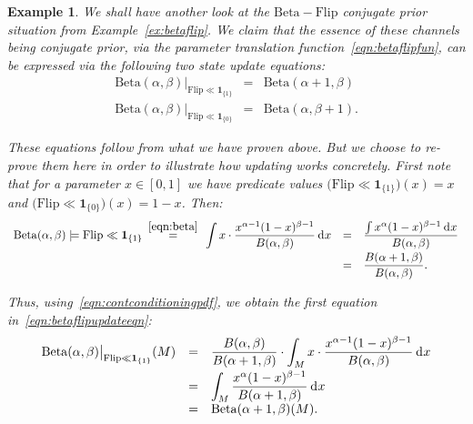 \documentclass{mscs}
\newcommand{\intd}{{\kern.2em}\mathrm{d}{\kern.03em}}
\newcommand{\indic}[1]{\mathbf{1}_{#1}}
\newcommand{\betachan}{\ensuremath{\mathrm{Beta}}}
\newcommand{\flipchan}{\ensuremath{\mathrm{Flip}}}
\newtheorem{example}[theorem]{Example}
\begin{document}
\begin{example}
\label{ex:betaflipupdate}
We shall have another look at the $\betachan - \flipchan$ conjugate
prior situation from Example~\ref{ex:betaflip}. We claim that the
essence of these channels being conjugate prior, via the parameter
translation function~\eqref{eqn:betaflipfun}, can be expressed via the
following two state update equations:
\begin{equation}
\label{eqn:betaflipupdateeqn}
\begin{array}{rcl}
\betachan(\alpha,\beta)\big|_{\flipchan \ll \indic{\{1\}}}
& = &
\betachan(\alpha+1,\beta)
\\
\betachan(\alpha,\beta)\big|_{\flipchan \ll \indic{\{0\}}}
& = &
\betachan(\alpha,\beta+1).
\end{array}
\end{equation}

\noindent These equations follow from what we have proven above. But
we choose to re-prove them here in order to illustrate how updating
works concretely. First note that for a parameter $x\in [0,1]$ we have
predicate values $\big(\flipchan \ll \indic{\{1\}}\big)(x) = x$ and
$\big(\flipchan \ll \indic{\{0\}}\big)(x) = 1-x$. Then:
\[ \begin{array}{rcl}
\betachan(\alpha,\beta) \models \flipchan \ll \indic{\{1\}}
\hspace*{\arraycolsep}\smash{\stackrel{\eqref{eqn:beta}}{=}}\hspace*{\arraycolsep}
\displaystyle\int x\cdot \frac{x^{\alpha-1}(1-x)^{\beta-1}}{B(\alpha,\beta)}\intd x
& = &
\displaystyle\frac{\int x^{\alpha}(1-x)^{\beta-1}\intd x}{B(\alpha,\beta)}
\\[+0.8em]
& = &
\displaystyle\frac{B(\alpha+1,\beta)}{B(\alpha,\beta)}.
\end{array} \]

\noindent Thus, using~\eqref{eqn:contconditioningpdf}, we obtain
the first equation in~\eqref{eqn:betaflipupdateeqn}:
\[ \begin{array}{rcl}
\betachan(\alpha,\beta)\big|_{\flipchan \ll \indic{\{1\}}}(M)
& = &
\displaystyle\frac{B(\alpha,\beta)}{B(\alpha+1,\beta)} \cdot
   \int_{M} x\cdot \frac{x^{\alpha-1}(1-x)^{\beta-1}}{B(\alpha,\beta)}\intd x
\\[+0.8em]
& = &
\displaystyle\int_{M} \frac{x^{\alpha}(1-x)^{\beta-1}}{B(\alpha+1,\beta)}\intd x
\\
& = &
\betachan(\alpha+1,\beta)(M).
\end{array} \]


\end{example}
\end{document}
